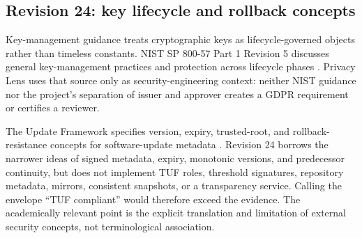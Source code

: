 

\subsection{Revision 24: key lifecycle and rollback concepts}

Key-management guidance treats cryptographic keys as lifecycle-governed objects rather than timeless constants. NIST SP 800-57 Part 1 Revision 5 discusses general key-management practices and protection across lifecycle phases \cite{nist80057r5}. Privacy Lens uses that source only as security-engineering context: neither NIST guidance nor the project's separation of issuer and approver creates a GDPR requirement or certifies a reviewer.

The Update Framework specifies version, expiry, trusted-root, and rollback-resistance concepts for software-update metadata \cite{tufspec}. Revision 24 borrows the narrower ideas of signed metadata, expiry, monotonic versions, and predecessor continuity, but does not implement TUF roles, threshold signatures, repository metadata, mirrors, consistent snapshots, or a transparency service. Calling the envelope ``TUF compliant'' would therefore exceed the evidence. The academically relevant point is the explicit translation and limitation of external security concepts, not terminological association.
